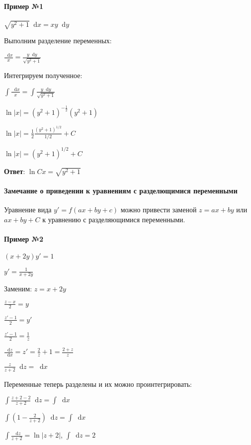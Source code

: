 \documentclass{article}
\newcommand*\diff{\mathop{}\!\mathrm{d}}
\begin{document}
\paragraph{Пример №1}

$\sqrt{y^2 + 1} \diff x = xy \diff y$

Выполним разделение переменных:

$\frac{\diff x}{x} = \frac{y \diff y}{\sqrt{y^2 + 1}}$

Интегрируем полученное:

$\int \frac{\diff x}{x} = \int \frac{y \diff y}{\sqrt{y^2 + 1}}$

$\ln |x| = (y^2 + 1)^{-\frac{1}{2}} (y^2 + 1)$

$\ln |x| = \frac{1}{2} \frac{(y^2 + 1)^{1/2}}{1/2} + C$

$\ln |x| = (y^2 + 1)^{1/2} + C$

\textbf{Ответ}: $\ln Cx = \sqrt{y^2 + 1}$

\paragraph{Замечание о приведении к уравнениям с разделющимися переменными}

Уравнение вида $y' = f(ax + by + c)$ можно привести заменой $z = ax + by$ или $ax + by + C$ к уравнению с разделяющимися переменными.

\paragraph{Пример №2}

$(x + 2y) y' = 1$

$y' = \frac{1}{x + 2y}$

Заменим: $z = x + 2y$

$\frac{z - x}{2} = y$

$\frac{z' - 1}{2} = y'$

$\frac{z' - 1}{2} = \frac{1}{z}$

$\frac{\diff z}{\diff x} = z' = \frac{2}{z} + 1 = \frac{2 + z}{z}$

$\frac{z}{z + 2} \diff z = \diff x$

Переменные теперь разделены и их можно проинтегрировать:

$\int \frac{z + 2 - 2}{z + 2} \diff z = \int \diff x$

$\int (1 - \frac{2}{z + 2}) \diff z = \int \diff x$

$\int \frac{\diff z}{z + 2} = \ln |z + 2|$, $\int \diff z = 2$
\end{document}
